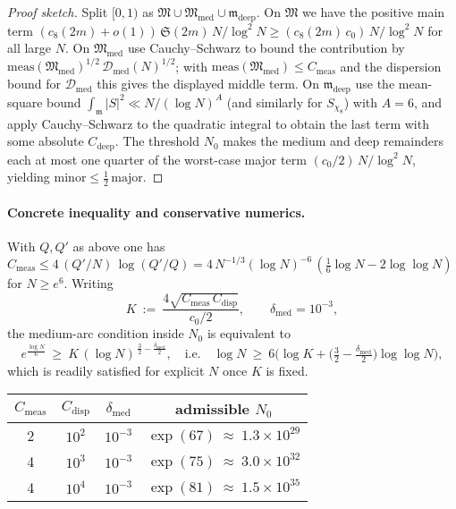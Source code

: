 \documentclass[11pt]{article}
\theoremstyle{definition}
\theoremstyle{remark}
\begin{document}
\begin{proof}[Proof sketch]
Split $[0,1)$ as $\mathfrak M\cup\mathfrak M_{\mathrm{med}}\cup\mathfrak m_{\mathrm{deep}}$. On $\mathfrak M$ we have the positive main term 
$(c_8(2m)+o(1))\,\mathfrak S(2m)\,N/\log^2N\ge (c_8(2m)\,c_0)\,N/\log^2N$ for all large $N$. 
On $\mathfrak M_{\mathrm{med}}$ use Cauchy–Schwarz to bound the contribution by $\mathrm{meas}(\mathfrak M_{\mathrm{med}})^{1/2}\,\mathcal D_{\mathrm{med}}(N)^{1/2}$; with $\mathrm{meas}(\mathfrak M_{\mathrm{med}})\le C_{\mathrm{meas}}$ and the dispersion bound for $\mathcal D_{\mathrm{med}}$ this gives the displayed middle term. 
On $\mathfrak m_{\mathrm{deep}}$ use the mean-square bound $\int_{\mathfrak m}|S|^2\ll N/(\log N)^A$ (and similarly for $S_{\chi_8}$) with $A=6$, and apply Cauchy–Schwarz to the quadratic integral to obtain the last term with some absolute $C_{\mathrm{deep}}$. 
The threshold $N_0$ makes the medium and deep remainders each at most one quarter of the worst-case major term $(c_0/2)\,N/\log^2N$, yielding $\mathrm{minor}\le \tfrac12\,\mathrm{major}$.
\end{proof}

\paragraph{Concrete inequality and conservative numerics.}
With $Q,Q'$ as above one has $C_{\mathrm{meas}}\le 4\,(Q'/N)\,\log(Q'/Q)=4\,N^{-1/3}(\log N)^{-6}\,(\tfrac16\log N-2\log\log N)$ for $N\ge e^6$. Writing 
\[
 K\ :=\ \frac{4\sqrt{C_{\mathrm{meas}}\,C_{\mathrm{disp}}}}{c_0/2},\qquad \delta_{\mathrm{med}}=10^{-3},
\]
the medium-arc condition inside $N_0$ is equivalent to
\[
 e^{\tfrac{\log N}{6}}\ \ge\ K\,(\log N)^{\,\tfrac32-\tfrac{\delta_{\mathrm{med}}}{2}},\quad\text{i.e.}\quad \log N\ \ge\ 6\Big(\log K+\big(\tfrac32-\tfrac{\delta_{\mathrm{med}}}{2}\big)\log\log N\Big),
\]
which is readily satisfied for explicit $N$ once $K$ is fixed.

\begin{center}
\begin{tabular}{c|c|c|c}
$C_{\mathrm{meas}}$ & $C_{\mathrm{disp}}$ & $\delta_{\mathrm{med}}$ & admissible $N_0$ \\
\hline
2 & $10^{2}$ & $10^{-3}$ & $\exp(67)\ \approx\ 1.3\times 10^{29}$ \\
4 & $10^{3}$ & $10^{-3}$ & $\exp(75)\ \approx\ 3.0\times 10^{32}$ \\
4 & $10^{4}$ & $10^{-3}$ & $\exp(81)\ \approx\ 1.5\times 10^{35}$ \\
\end{tabular}
\end{center}
\end{document}
